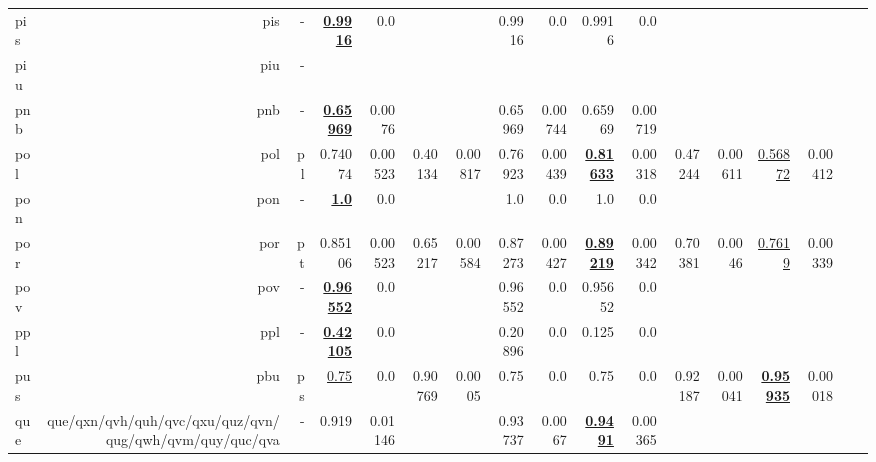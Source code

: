 \documentclass[11pt]{article}
\begin{document}
\begin{table*}[h]
{\begin{tabular}{lrrrrrrrrrrrrrrrr}
pis         & pis         & -         & \textbf{\underline{0.9916}}         & 0.0         &          &          & 0.9916         & 0.0         & 0.9916         & 0.0         &          &          &          &          \\
piu         & piu         & -         &          &          &          &          &          &          &          &          &          &          &          &          \\
pnb         & pnb         & -         & \textbf{\underline{0.65969}}         & 0.0076         &          &          & 0.65969         & 0.00744         & 0.65969         & 0.00719         &          &          &          &          \\
pol         & pol         & pl         & 0.74074         & 0.00523         & 0.40134         & 0.00817         & 0.76923         & 0.00439         & \textbf{\underline{0.81633}}         & 0.00318         & 0.47244         & 0.00611         & \underline{0.56872}         & 0.00412         \\
pon         & pon         & -         & \textbf{\underline{1.0}}         & 0.0         &          &          & 1.0         & 0.0         & 1.0         & 0.0         &          &          &          &          \\
por         & por         & pt         & 0.85106         & 0.00523         & 0.65217         & 0.00584         & 0.87273         & 0.00427         & \textbf{\underline{0.89219}}         & 0.00342         & 0.70381         & 0.0046         & \underline{0.7619}         & 0.00339         \\
pov         & pov         & -         & \textbf{\underline{0.96552}}         & 0.0         &          &          & 0.96552         & 0.0         & 0.95652         & 0.0         &          &          &          &          \\
ppl         & ppl         & -         & \textbf{\underline{0.42105}}         & 0.0         &          &          & 0.20896         & 0.0         & 0.125         & 0.0         &          &          &          &          \\
pus         & pbu         & ps         & \underline{0.75}         & 0.0         & 0.90769         & 0.0005         & 0.75         & 0.0         & 0.75         & 0.0         & 0.92187         & 0.00041         & \textbf{\underline{0.95935}}         & 0.00018         \\
que         & que/qxn/qvh/quh/qvc/qxu/quz/qvn/qug/qwh/qvm/quy/quc/qva         & -         & 0.919         & 0.01146         &          &          & 0.93737         & 0.0067         & \textbf{\underline{0.9491}}         & 0.00365         &          &          &          &          \\

\end{tabular}}
\end{table*}
\end{document}
